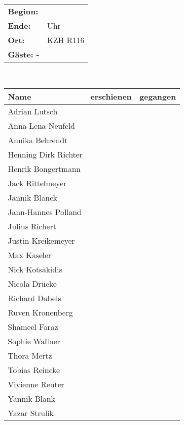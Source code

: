 \documentclass[]{article}
\begin{document}
\begin{tabular}{l l}
	\textbf{Beginn:} &  \zeit \heute  \\
	\textbf{Ende:} & Uhr\\
	\textbf{Ort:} & KZH R116\\
	\textbf{Gäste: -}
\end{tabular}\\
\begin{table}[h]
	\centering
	\begin{tabular}{|l|c|c|}
		\hline
		Name & erschienen & gegangen \\
		\hline
		Adrian Lutsch        & \zeit & \zuende \\
		Anna-Lena Neufeld    & \zeit & \zuende \\
		Annika Behrendt      & \zeit & \zuende \\
		Henning Dirk Richter &\zeit & \zuende \\
		Henrik Bongertmann   & \zeit & \zuende \\
		Jack Rittelmeyer     & \zeit & \zuende \\
		Jannik Blanck & \zeit & \zuende\\
		Jann-Hannes Polland  & \zeit & \zuende \\
		Julius Richert       & \zeit &\zuende \\
		Justin Kreikemeyer   & \zeit &\zuende \\
		Max Kaseler          & \zeit &\zuende \\
		Nick Kotsakidis      & \zeit & \zuende\\
		Nicola Drüeke        & \zeit & \zuende\\
		Richard Dabels       & \zeit &\zuende \\
		Ruven Kronenberg     &\zeit &\zuende \\
		Shameel Faraz        & \zeit &\zuende \\
		Sophie Wallner       & \zeit & \zuende\\
		Thora Mertz          & \zeit & \zuende \\
		Tobias Reincke       & \zeit &\zuende \\
		Vivienne Reuter      & \zeit&\zuende \\
		Yannik Blank         &\zeit&\zuende \\
		Yazar Strulik        &\zeit & \zuende\\
		\hline
	\end{tabular}
\end{table}\\
\pagebreak
\tableofcontents
\end{document}
